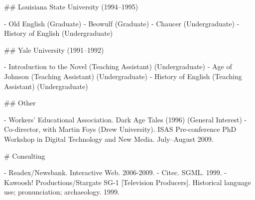 \sectionbreak{}
## Louisiana State University (1994–1995)

- Old English (Graduate)
- Beowulf (Graduate)
- Chaucer (Undergraduate)
- History of English (Undergraduate)

\sectionbreak{}
## Yale University (1991–1992)

- Introduction to the Novel (Teaching Assistant) (Undergraduate)
- Age of Johnson (Teaching Assistant) (Undergraduate)
- History of English (Teaching Assistant) (Undergraduate)

\sectionbreak{}
## Other

- Workers’ Educational Association. Dark Age Tales (1996) (General Interest)
- Co-director, with Martin Foys (Drew University). ISAS Pre-conference PhD Workshop in Digital Technology and New Media. July–August 2009.

\sectionbreak{}
# Consulting

- Readex/\allowbreak{}Newsbank. Interactive Web. 2006-2009.
- Citec. SGML. 1999.
- Kawoosh! Productions/\allowbreak{}Stargate SG-1 [Television Producers]. Historical language use; pronunciation; archaeology. 1999.


